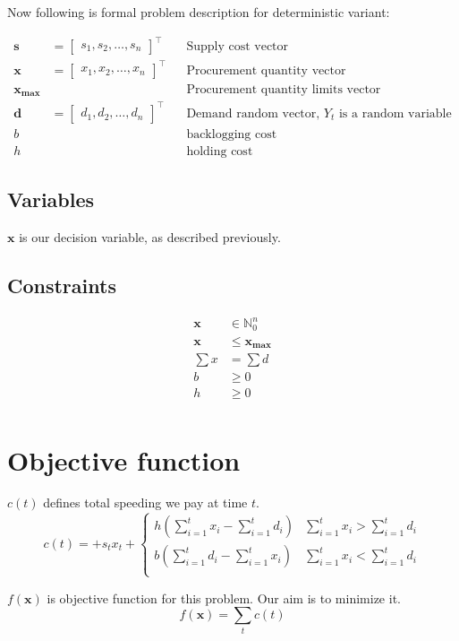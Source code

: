 Now following is formal problem description for deterministic variant:

\begin{align*}
    \mathbf{s} &= \begin{bmatrix}
        s_1, s_2, \dotsc, s_n
    \end{bmatrix}^\intercal && \text{Supply cost vector} \\
    \mathbf{x} &= \begin{bmatrix}
        x_1, x_2, \dotsc, x_n
    \end{bmatrix}^\intercal && \text{Procurement quantity vector} \\
    \mathbf{x_{\max}}  & && \text{Procurement quantity limits vector} \\
    \mathbf{d} &= \begin{bmatrix}
        d_1, d_2, \dotsc, d_n
    \end{bmatrix}^\intercal && \text{Demand random vector, $Y_t$ is a random variable} \\
    b & && \text{backlogging cost} \\
    h & && \text{holding cost}
\end{align*}

\subsection{Variables}
\label{sub:Variables}
$\mathbf{x}$ is our decision variable, as described previously.
\subsection{Constraints}
\label{sub:Constraints}
\begin{align*}
    \mathbf{x} &\in \mathbb{N}_0^n \\
    \mathbf{x} &\le \mathbf{x_{\text{max}}}\\
    \sum{x} &= \sum{d} \\
    b &\ge 0\\
    h &\ge 0\\
\end{align*}

\section{Objective function}

\begin{definition}{$c(t)$}
defines total speeding we pay at time $t$.
    \begin{equation}
        \label{eq:cost-t}
        c(t) = + s_t x_t + \begin{cases}
        h \left( \sum_{i=1}^t{x_i} - \sum_{i=1}^t{d_i} \right)  &
            \sum_{i=1}^t{x_i} > \sum_{i=1}^t{d_i}  \\
        b \left(\sum_{i=1}^t{d_i} - \sum_{i=1}^t{x_i} \right) &
            \sum_{i=1}^t{x_i} < \sum_{i=1}^t{d_i} \\
        \end{cases}
    \end{equation}
\end{definition}

\begin{definition}{$f(\mathbf{x})$}
    is objective function for this problem. Our aim is to minimize it.
    \begin{equation}
        f(\mathbf{x}) =  \sum_t{c(t)}
        \label{eq:cost-f}
    \end{equation}
\end{definition}

